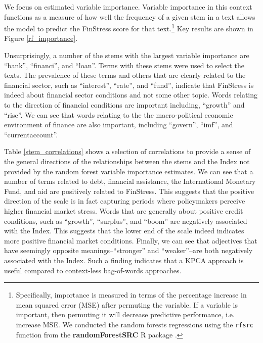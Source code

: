 \documentclass[]{article}
\begin{document}
We focus on estimated variable importance. Variable importance in this context functions as a measure of how well the frequency of a given stem in a text allows the model to predict the FinStress score for that text.\footnote{Specifically, importance is measured in terms of the percentage increase in mean squared error (MSE) after permuting the variable. If a variable is important, then permuting it will decrease predictive performance, i.e. increase MSE. We conducted the random forests regressions using the \texttt{rfsrc} function from the \textbf{randomForestSRC} R package \citep{randomForestSRCCite}.} Key results are shown in Figure \ref{rf_importance}.

Unsurprisingly, a number of the stems with the largest variable importance are ``bank'', ``financi'', and ``loan''. Terms with these stems were used to select the texts. The prevalence of these terms and others that are clearly related to the financial sector, such as ``interest'', ``rate'', and ``fund'', indicate that FinStress is indeed about financial sector conditions and not some other topic. Words relating to the direction of financial conditions are important including, ``growth'' and ``rise''. We can see that words relating to the the macro-political economic environment of finance are also important, including ``govern'', ``imf'', and ``currentaccount''.

Table \ref{stem_correlations} shows a selection of correlations to provide a sense of the general directions of the relationships between the stems and the Index not provided by the random forest variable importance estimates. We can see that a number of terms related to debt, financial assistance, the International Monetary Fund, and aid are positively related to FinStress. This suggests that the positive direction of the scale is in fact capturing periods where policymakers perceive higher financial market stress. Words that are generally about positive credit conditions, such as ``growth'', ``surplus'', and ``boom'' are negatively associated with the Index. This suggests that the lower end of the scale indeed indicates more positive financial market conditions. Finally, we can see that adjectives that have seemingly opposite meanings--``stronger'' and ``weaker''--are both negatively associated with the Index. Such a finding indicates that a KPCA approach is useful compared to context-less bag-of-words approaches.
\end{document}
